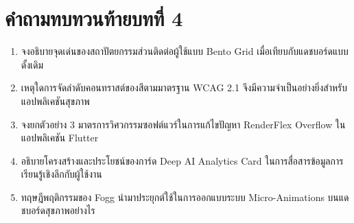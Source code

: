 \section*{คำถามทบทวนท้ายบทที่ 4}
\begin{enumerate}
    \item จงอธิบายจุดเด่นของสถาปัตยกรรมส่วนติดต่อผู้ใช้แบบ Bento Grid เมื่อเทียบกับแดชบอร์ดแบบดั้งเดิม
    \item เหตุใดการจัดลำดับคอนทราสต์ของสีตามมาตรฐาน WCAG 2.1 จึงมีความจำเป็นอย่างยิ่งสำหรับแอปพลิเคชันสุขภาพ
    \item จงยกตัวอย่าง 3 มาตรการวิศวกรรมซอฟต์แวร์ในการแก้ไขปัญหา RenderFlex Overflow ในแอปพลิเคชัน Flutter
    \item อธิบายโครงสร้างและประโยชน์ของการ์ด Deep AI Analytics Card ในการสื่อสารข้อมูลการเรียนรู้เชิงลึกกับผู้ใช้งาน
    \item ทฤษฎีพฤติกรรมของ Fogg นำมาประยุกต์ใช้ในการออกแบบระบบ Micro-Animations บนแดชบอร์ดสุขภาพอย่างไร
\end{enumerate}
\clearpage
